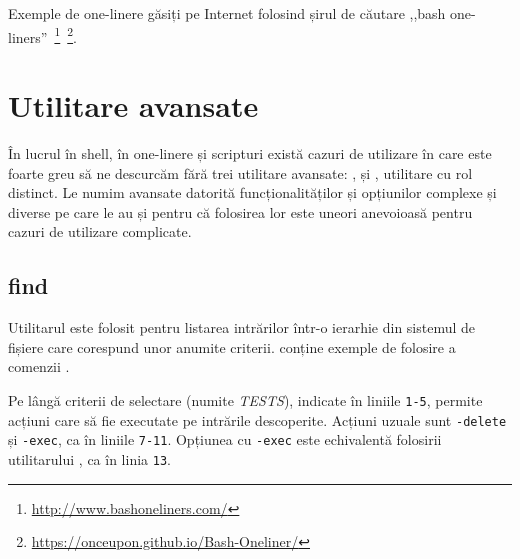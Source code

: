 Exemple de one-linere găsiți pe Internet folosind șirul de căutare ,,bash one-liners''~\footnote{\url{http://www.bashoneliners.com/}}~\footnote{\url{https://onceupon.github.io/Bash-Oneliner/}}.

\section{Utilitare avansate}
\label{sec:cli:advanced}

În lucrul în shell, în one-linere și scripturi există cazuri de utilizare în
care este foarte greu să ne descurcăm fără trei utilitare avansate: ,  și
, utilitare cu rol distinct. Le numim avansate datorită funcționalităților și
opțiunilor complexe și diverse pe care le au și pentru că folosirea lor este
uneori anevoioasă pentru cazuri de utilizare complicate.

\subsection{find}
\label{sec:cli:advanced:find}

Utilitarul  este folosit pentru listarea intrărilor într-o ierarhie din
sistemul de fișiere care corespund unor anumite criterii.  conține exemple de folosire a comenzii .


Pe lângă criterii de selectare (numite \textit{TESTS}), indicate în liniile \texttt{1-5},  permite acțiuni care să fie
executate pe intrările descoperite. Acțiuni uzuale sunt \texttt{-delete} și \texttt{-exec}, ca în liniile \texttt{7-11}. Opțiunea cu \texttt{-exec} este echivalentă folosirii utilitarului , ca în linia \texttt{13}.

